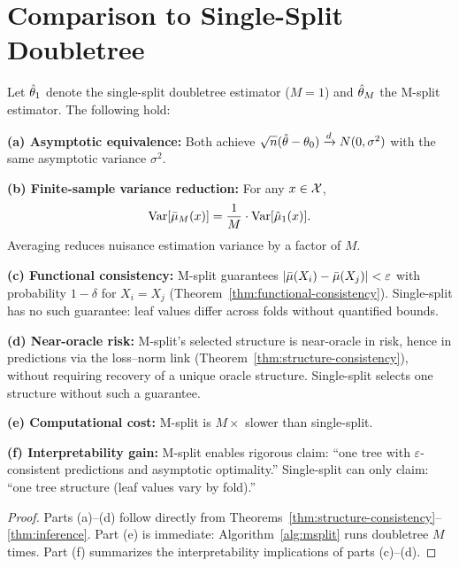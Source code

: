 \documentclass[12pt]{article}
\newcommand{\convd}{\xrightarrow{d}}
\begin{document}
\section{Comparison to Single-Split Doubletree}

\begin{proposition}
\label{prop:comparison}
Let $\hat{\theta}_1$ denote the single-split doubletree estimator ($M=1$) and $\hat{\theta}_M$ the M-split estimator. The following hold:

\textbf{(a) Asymptotic equivalence:} Both achieve $\sqrt{n}(\thetahat - \theta_0) \convd N(0, \sigma^2)$ with the same asymptotic variance $\sigma^2$.

\textbf{(b) Finite-sample variance reduction:} For any $x \in \mathcal{X}$,
\[
\operatorname{Var}[\bar{\mu}_M(x)] = \frac{1}{M} \cdot \operatorname{Var}[\hat{\mu}_1(x)].
\]
Averaging reduces nuisance estimation variance by a factor of $M$.

\textbf{(c) Functional consistency:} M-split guarantees $|\bar{\mu}(X_i) - \bar{\mu}(X_j)| < \varepsilon$ with probability $1 - \delta$ for $X_i = X_j$ (Theorem~\ref{thm:functional-consistency}). Single-split has no such guarantee: leaf values differ across folds without quantified bounds.

\textbf{(d) Near-oracle risk:} M-split's selected structure is near-oracle in risk, hence in predictions via the loss--norm link (Theorem~\ref{thm:structure-consistency}), without requiring recovery of a unique oracle structure. Single-split selects one structure without such a guarantee.

\textbf{(e) Computational cost:} M-split is $M\times$ slower than single-split.

\textbf{(f) Interpretability gain:} M-split enables rigorous claim: ``one tree with $\varepsilon$-consistent predictions and asymptotic optimality.'' Single-split can only claim: ``one tree structure (leaf values vary by fold).''
\end{proposition}

\begin{proof}
Parts (a)--(d) follow directly from Theorems~\ref{thm:structure-consistency}--\ref{thm:inference}. Part (e) is immediate: Algorithm~\ref{alg:msplit} runs doubletree $M$ times. Part (f) summarizes the interpretability implications of parts (c)--(d).
\end{proof}
\end{document}
